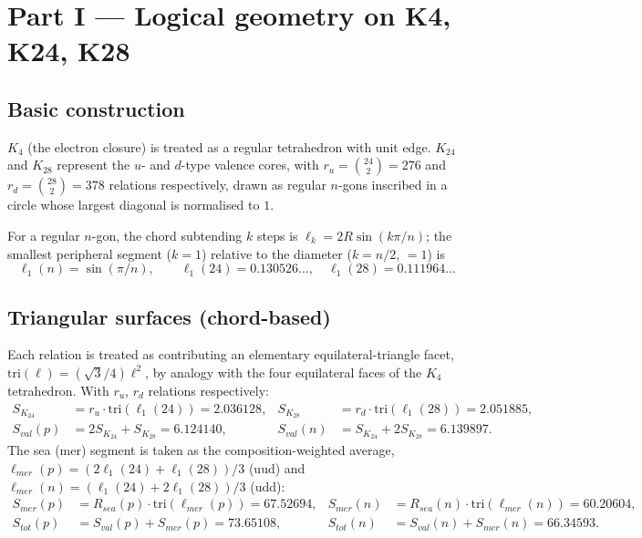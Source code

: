 \documentclass[11pt]{article}
\def\texorpdfstring#1#2{#2}%
\begin{document}
\section{Part I --- Logical geometry on \texorpdfstring{$K_4$}{K4}, \texorpdfstring{$K_{24}$}{K24}, \texorpdfstring{$K_{28}$}{K28}}
\label{sec:geom}

\subsection{Basic construction}
$K_4$ (the electron closure) is treated as a regular tetrahedron with unit edge. $K_{24}$ and $K_{28}$ represent the $u$- and $d$-type valence cores, with $r_u=\binom{24}{2}=276$ and $r_d=\binom{28}{2}=378$ relations respectively, drawn as regular $n$-gons inscribed in a circle whose largest diagonal is normalised to $1$.

For a regular $n$-gon, the chord subtending $k$ steps is $\ell_k=2R\sin(k\pi/n)$; the smallest peripheral segment ($k=1$) relative to the diameter ($k=n/2$, $=1$) is
\begin{equation}
\ell_1(n) = \sin(\pi/n), \qquad \ell_1(24)=0.130526\ldots,\quad \ell_1(28)=0.111964\ldots
\end{equation}

\subsection{Triangular surfaces (chord-based)}
Each relation is treated as contributing an elementary equilateral-triangle facet, $\mathrm{tri}(\ell)=(\sqrt3/4)\ell^2$, by analogy with the four equilateral faces of the $K_4$ tetrahedron. With $r_u$, $r_d$ relations respectively:
\begin{align}
S_{K_{24}} &= r_u\cdot\mathrm{tri}(\ell_1(24)) = 2.036128, & S_{K_{28}} &= r_d\cdot\mathrm{tri}(\ell_1(28)) = 2.051885,\\
S_{val}(p) &= 2S_{K_{24}}+S_{K_{28}} = 6.124140, & S_{val}(n) &= S_{K_{24}}+2S_{K_{28}} = 6.139897.
\end{align}
The sea (mer) segment is taken as the composition-weighted average, $\ell_{mer}(p)=(2\ell_1(24)+\ell_1(28))/3$ (uud) and $\ell_{mer}(n)=(\ell_1(24)+2\ell_1(28))/3$ (udd):
\begin{align}
S_{mer}(p) &= R_{sea}(p)\cdot\mathrm{tri}(\ell_{mer}(p)) = 67.52694, & S_{mer}(n) &= R_{sea}(n)\cdot\mathrm{tri}(\ell_{mer}(n)) = 60.20604,\\
S_{tot}(p) &= S_{val}(p)+S_{mer}(p) = 73.65108, & S_{tot}(n) &= S_{val}(n)+S_{mer}(n) = 66.34593.
\end{align}
\end{document}

